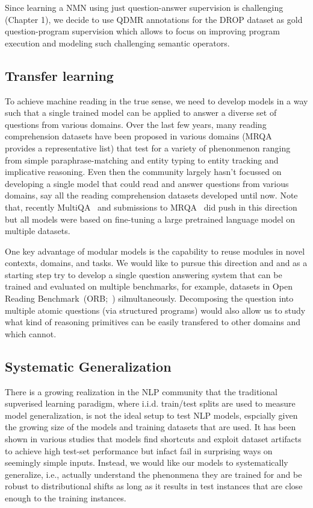 \documentclass[main.tex]{subfiles}
\begin{document}
Since learning a NMN using just question-answer supervision is challenging (Chapter 1), we decide to use QDMR annotations for the DROP dataset as gold question-program supervision which allows to focus on improving program execution and modeling such challenging semantic operators.

\subsection{Transfer learning}
To achieve machine reading in the true sense, we need to develop models in a way such that a single trained model can be applied to answer a diverse set of questions from various domains.  Over the last few years, many reading comprehension datasets have been proposed in various domains (MRQA~\cite{mrqa-2019} provides a representative list) that test for a variety of phenonmenon ranging from simple paraphrase-matching and entity typing to entity tracking and implicative reasoning.
Even then the community largely hasn't focussed on developing a single model that could read and answer questions from various domains, say all the reading comprehension datasets developed until now.  Note that, recently MultiQA~\cite{talmor-multiqa-2019} and submissions to MRQA~\cite{mrqa-2019} did push in this direction but all models were based on fine-tuning a large pretrained language model on multiple datasets.

One key advantage of modular models is the capability to reuse modules in novel contexts, domains, and tasks. We would like to pursue this direction and and as a starting step try to develop a single question answering system that can be trained and evaluated on multiple benchmarks, for example, datasets in Open Reading Benchmark~(ORB;~) silmultaneously.  Decomposing the question into multiple atomic questions (via structured programs) would also allow us to study what kind of reasoning primitives can be easily transfered to other domains and which cannot.

\subsection{Systematic Generalization}
There is a growing realization in the NLP community that the traditional supverised learning paradigm, where i.i.d. train/test splits are used to measure model generalization, is not the ideal setup to test NLP models, espcially given the growing size of the models and training datasets that are used.  It has been shown in various studies that models find shortcuts and exploit dataset artifacts to achieve high test-set performance but infact fail in surprising ways on seemingly simple inputs.  Instead, we would like our models to systematically generalize, i.e., actually understand the phenonmena they are trained for and be robust to distributional shifts as long as it results in test instances that are close enough to the training instances.
\end{document}
